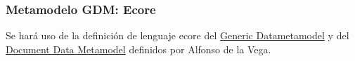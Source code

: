 \subsubsection*{Metamodelo GDM: Ecore}
Se hará uso de la definición de lenguaje ecore del \href{https://github.com/alfonsodelavega/mortadelo/blob/master/es.unican.istr.mortadelo.gdm.lang.parent/es.unican.istr.mortadelo.gdm.lang/model/generated/GdmLang.ecore}{Generic Datametamodel} y del \href{https://github.com/alfonsodelavega/mortadelo/blob/master/es.unican.istr.mortadelo.documentDataModel/model/documentDataModel.ecore}{Document Data Metamodel} definidos por Alfonso de la Vega.